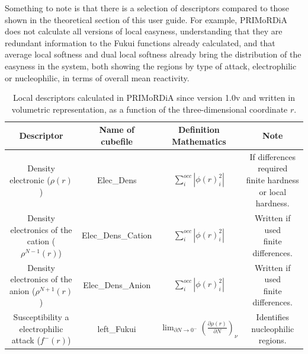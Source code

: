 \documentclass[a4paper,11pt]{refart}
\begin{document}
Something to note is that there is a selection of descriptors compared to those shown in the theoretical section of this user guide. For example, PRIMoRDiA does not calculate all versions of local easyness, understanding that they are redundant information to the Fukui functions already calculated, and that average local softness and dual local softness already bring the distribution of the easyness in the system, both showing the regions by type of attack, electrophilic or nucleophilic, in terms of overall mean reactivity.

\hspace*{-\leftmarginwidth}
\begin{minipage}{\fullwidth}
	\begin{table}[H]
		\centering
		\caption{Local descriptors calculated in PRIMoRDiA since version 1.0v and written in volumetric representation, as a function of the three-dimensional coordinate $r$.}
		\begin{tabular}{c|c|c|c}
			\toprule
			Descriptor &\makecell{Name of\\cubefile}&\makecell{Definition\\Mathematics}&Note \\
			\midrule
			\makecell{Density \\electronic ($\rho(r)$)} &Elec\_Dens &$\sum_{i}^{occ} |\phi(r)^2_i|$ & \makecell{If differences required\\ finite hardness or local hardness.} \\\hline
			\makecell{Density \\electronics of the \\cation ($\rho^{N-1}(r)$)} &Elec\_Dens\_Cation &$\sum_{i}^{occ} |\phi(r)^ 2_i|$ & \makecell{Written if used\\ finite differences.} \\\hline
			\makecell{Density \\electronics of the\\ anion ($\rho^{N+1}(r)$)} &Elec\_Dens\_Anion&$\sum_{i}^{occ} |\phi(r)^2_i |$ & \makecell{Written if used\\ finite differences.} \\\hline
			\makecell{Susceptibility \\a electrophilic attack\\ ($f^-(r)$)} &left\_Fukui&$\lim_{\partial N \to 0^-}\left(\frac{\partial \rho(r )}{\partial N} \right)_\nu$ & \makecell{Identifies nucleophilic\\ regions.} \\ \hline

\end{tabular}
\end{table}
\end{minipage}
\end{document}
